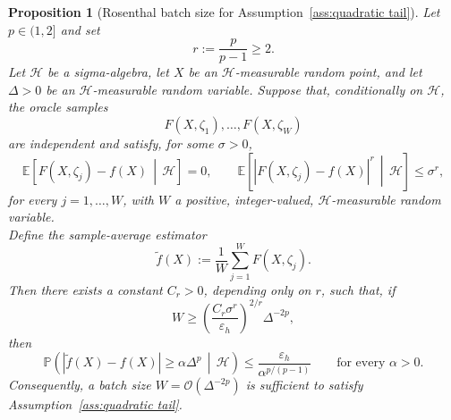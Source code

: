 \documentclass[11pt,a4paper]{article}
\newtheorem{proposition}{Proposition}[section]
\newcommand{\f}{\tilde{f}}
\begin{document}
\begin{proposition}[Rosenthal batch size for Assumption~\ref{ass:quadratic tail}]
\label{prop:rosenthal-ass33}
Let \(p\in(1,2]\) and set
\[
    r:=\frac{p}{p-1}\ge2.
\]
Let \(\mathcal H\) be a sigma-algebra, let \(X\) be an
\(\mathcal H\)-measurable random point, and let \(\Delta>0\) be an
\(\mathcal H\)-measurable random variable.
Suppose that, conditionally on \(\mathcal H\), the oracle samples
\[
    F(X,\zeta_1),\ldots,F(X,\zeta_W)
\]
are independent and satisfy, for some \(\sigma>0\),
\[
    \mathbb E\!\left[
        F(X,\zeta_j)-f(X)
        \,\middle|\,
        \mathcal H
    \right]
    =0, 
    \qquad 
    \mathbb E\!\left[
        \left|F(X,\zeta_j)-f(X)\right|^r
        \,\middle|\,
        \mathcal H
    \right]
    \le \sigma^r,
\]
for every \(j=1,\ldots,W\), with \(W\) a positive, integer-valued,
\(\mathcal H\)-measurable random variable.\\
Define the sample-average estimator
\[
    \tilde f(X)
    :=
    \frac{1}{W}
    \sum_{j=1}^{W}F(X,\zeta_j).
\]
Then there exists a constant \(C_r>0\), depending only on \(r\), such that,
if
\[
    W
    \ge
    \left(
        \frac{C_r\sigma^r}{\varepsilon_h}
    \right)^{2/r}
    \Delta^{-2p},
\]
then
\[
    \mathbb P\!\left(
        |\tilde f(X)-f(X)|
        \ge
        \alpha\Delta^p
        \,\middle|\,
        \mathcal H
    \right)
    \le
    \frac{\varepsilon_h}{\alpha^{p/(p-1)}}
    \qquad
    \text{for every }\alpha>0.
\]
Consequently, a batch size
 $W=\mathcal O(\Delta^{-2p})$
is sufficient to satisfy Assumption~\ref{ass:quadratic tail}.
\end{proposition}
\end{document}
